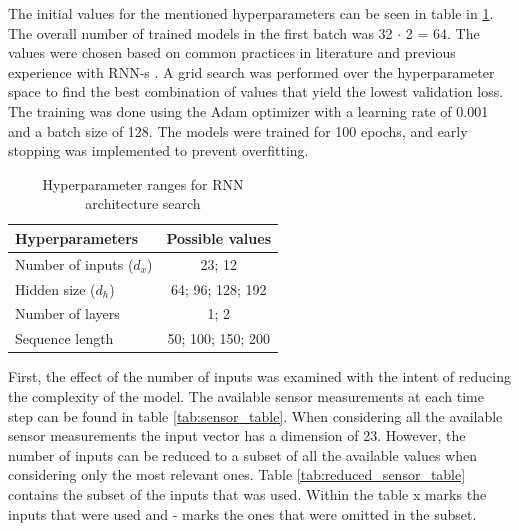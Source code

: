 The initial values for the mentioned hyperparameters can be seen in table in \ref{tab:rnn_hyperparams_1}. The overall number of trained models in the first batch was 32 $\cdot$ 2 = 64. The values were chosen based on common practices in literature and previous experience with RNN-s \cite{rnn_reference}. A grid search was performed over the hyperparameter space to find the best combination of values that yield the lowest validation loss. The training was done using the Adam optimizer with a learning rate of 0.001 and a batch size of 128. The models were trained for 100 epochs, and early stopping was implemented to prevent overfitting.
\begin{table}[h]
    \centering
    \begin{tabular}{|l|c|}
        \hline
        \textbf{Hyperparameters} & \textbf{Possible values} \\
        \hline \hline
        Number of inputs ($d_x$) & 23; 12 \\
        \hline
        Hidden size ($d_h$) & 64; 96; 128; 192 \\
        \hline
        Number of layers & 1; 2 \\
        \hline
        Sequence length & 50; 100; 150; 200 \\
        \hline
    \end{tabular}
    \caption{Hyperparameter ranges for RNN architecture search}
    \label{tab:rnn_hyperparams_1}
\end{table}

First, the effect of the number of inputs was examined with the intent of reducing the complexity of the model. The available sensor measurements at each time step can be found in table \ref{tab:sensor_table}. When considering all the available sensor measurements the input vector has a dimension of 23. However, the number of inputs can be reduced to a subset of all the available values when considering only the most relevant ones. Table \ref{tab:reduced_sensor_table} contains the subset of the inputs that was used. Within the table x marks the inputs that were used and - marks the ones that were omitted in the subset.

